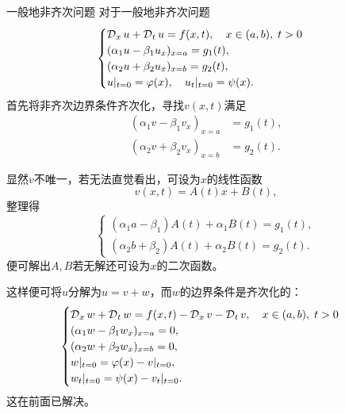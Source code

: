 \begin{method}{一般地非齐次问题}{}
	对于一般地非齐次问题
	\begin{align*}
		\begin{cases}
			\operatorname{\mathcal D}_xu + \operatorname{\mathcal D}_tu = f(x,t),\quad x \in (a,b),\;t > 0\\
			(\alpha_1u - \beta_1u_x)_{x=a} = g_1(t),\\
			(\alpha_2u + \beta_2u_x)_{x=b} = g_2(t),\\
			{u}\rvert_{t=0} = \varphi(x),\quad{u_t}\rvert_{t=0} = \psi(x).
		\end{cases}
	\end{align*}
	首先将非齐次边界条件齐次化，寻找$v(x,t)$满足 
	\begin{align*}
		(\alpha_1v - \beta_1v_x)_{x=a} &= g_1(t),\\
		(\alpha_2v + \beta_2v_x)_{x=b} &= g_2(t).
	\end{align*}
	
	显然$v$不唯一，若无法直觉看出，可设为$x$的线性函数
	\[
		v(x,t) = A(t)x + B(t),
	\]
	整理得
	\[
		\begin{cases}
			(\alpha_1a - \beta_1)A(t) + \alpha_1B(t) = g_1(t),\\
			(\alpha_2b + \beta_2)A(t) + \alpha_2B(t) = g_2(t).
		\end{cases}
	\]
	便可解出$A,B$若无解还可设为$x$的二次函数。
	
	这样便可将$u$分解为$u = v + w$，而$w$的边界条件是齐次化的：
	\begin{equation}
		\label{eq:mmp-boundary-lifting}
		\begin{cases}
			\operatorname{\mathcal D}_xw + \operatorname{\mathcal D}_tw = f(x,t) - \operatorname{\mathcal D}_xv - \operatorname{\mathcal D}_tv,\quad x \in (a,b),\;t > 0\\
			(\alpha_1w - \beta_1w_x)_{x=a} = 0,\\
			(\alpha_2w + \beta_2w_x)_{x=b} = 0,\\
			{w}\rvert_{t=0} = \varphi(x) - {v}\rvert_{t=0},\\
			{w_t}\rvert_{t=0} = \psi(x) - {v_t}\rvert_{t=0}.
		\end{cases}
	\end{equation}
	这在前面已解决。
\end{method}

